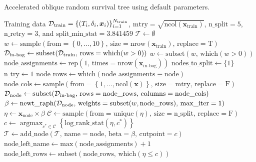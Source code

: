 \documentclass[12pt]{article}\usepackage[]{graphicx}\usepackage[]{xcolor}
\DeclareMathOperator*{\argmax}{argmax}
\newcommand{\dataset}{{\cal D}}
\begin{document}
\begin{algorithm}
    \caption{Accelerated oblique random survival tree using default parameters.} \label{alg:aorsf}
  \begin{algorithmic}[1]
    \Require Training data $\dataset_{\text{train}} = \left\{ (T_i, \delta_i, \bm{x}_{i}) \right\}_{i=1}^{N_{\text{train}}}$, $\text{mtry} = \sqrt{\text{ncol}(\bm{x}_{\text{train}})}$, $\text{n\_split} = 5$, $\text{n\_retry} = 3$, and $\text{split\_min\_stat} = 3.841459$
    \State $\mathcal{T} \gets \emptyset$
    \State $w \gets \text{sample}(\text{from} = \left\{0, \ldots, 10\right\},\,\text{size} = \text{nrow}(\bm{x}_{\text{train}}),\, \text{replace} = \text{T})$
    \State $\dataset_{\text{in-bag}} \gets \text{subset}(\dataset_{\text{train}},\,\text{rows} = \text{which}(w > 0))$
    \State $w \gets \text{subset}(w,\, \text{which}(w > 0))$
    \State $\text{node\_assignments} \gets \text{rep}(1,\,\text{times} = \text{nrow}(\bm{x}_{\text{in-bag}}))$
    \State $\text{nodes\_to\_split} \gets \{1\}$
       \State $\text{n\_try} \gets 1$
       \State $\text{node\_rows} \gets \text{which}(\text{node\_assignments} \equiv \text{node})$
       \State $\text{node\_cols} \gets \text{sample}(\text{from} = \left\{1, \ldots, \text{ncol}(\bm{x})\right\},\, \text{size} = \text{mtry},\,\text{replace} = \text{F})$ \label{marker}
       \State $\dataset_{\text{node}} \gets \text{subset}(\dataset_{\text{in-bag}},\,\text{rows} = \text{node\_rows},\,\text{columns} = \text{node\_cols})$
       \State $\beta \gets \text{newt\_raph}(\dataset_{\text{node}},\, \text{weights} = \text{subset}(w, \text{node\_rows}),\, \text{max\_iter} = 1)$
       \State $\eta \gets \bm{x}_{\text{node}} \times \beta$
       \State $\mathcal{C} \gets \text{sample}(\text{from} = \text{unique}(\eta),\, \text{size} = \text{n\_split},\,\text{replace} = \text{F})$
       \State $c \gets \argmax_{c^* \in \mathcal{C}} \left\{ \text{log\_rank\_stat}(\eta, c^*) \right\}$
         \State $\mathcal{T} \gets \text{add\_node}(\mathcal{T},\, \text{name} = \text{node},\, \text{beta} = \beta,\, \text{cutpoint} = c)$
         \State {}
         \State $\text{node\_left\_name} \gets \text{max}(\text{node\_assignments}) + 1$
         \State $\text{node\_left\_rows} \gets \text{subset}(\text{node\_rows},\,\text{which}(\eta \leq c))$

\end{algorithmic}
\end{algorithm}
\end{document}

